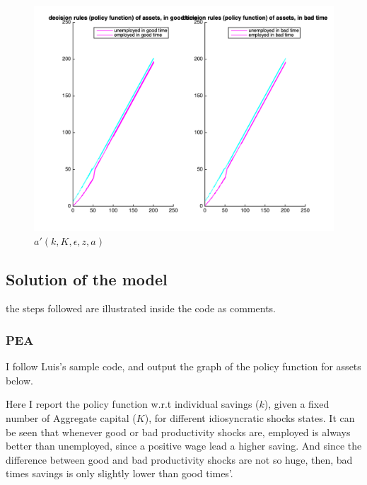 \begin{figure}[htbp]
\centering
\includegraphics[width=\textwidth]{img/Q2_1_ab.png}
\caption{$a'(k,K,\epsilon,z,a)$}
\end{figure}


\subsection{Solution of the model}

the steps followed are illustrated inside the code as comments. 


\subsubsection{PEA}
I follow Luis's sample code, and output the graph of the policy function for assets below. 

Here I report the policy function w.r.t individual savings ($k$), given a fixed number of Aggregate capital ($K$), for different idiosyncratic shocks states. 
It can be seen that whenever good or bad productivity shocks are, employed is always better than unemployed, since a positive wage lead a higher saving. And since the difference between good and bad productivity shocks are not so huge, then, bad times savings is only slightly lower than good times'. 

